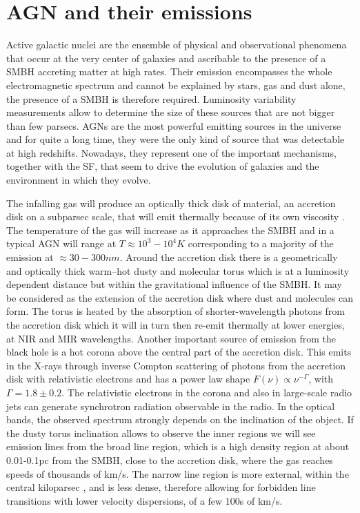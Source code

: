 \section{AGN and their emissions}
Active galactic nuclei are the ensemble of physical and observational phenomena that occur at the very center of galaxies and ascribable to the presence of a SMBH accreting matter at high rates. Their emission encompasses the whole electromagnetic spectrum and cannot be explained by stars, gas and dust alone, the presence of a SMBH is therefore required. Luminosity variability measurements allow to determine the size of these sources that are not bigger than few parsecs. AGNs are the most powerful emitting sources in the universe and for quite a long time, they were the only kind of source that was detectable at high redshifts. Nowadays, they represent one of the important mechanisms, together with the SF, that seem to drive the evolution of galaxies and the environment in which they evolve.

The infalling gas will produce an optically thick disk of material, an accretion disk on a subparsec scale, that will emit thermally because of its own viscosity \citep[e.g.][]{1973A&A....24..337S, 1984ARA&A..22..471R}. The temperature of the gas will increase as it approaches the SMBH and in a typical AGN will range at $T \approx 10^3-10^4 K$ corresponding to a majority of the emission at $\approx 30-300 nm$.
Around the accretion disk there is a geometrically and optically thick warm–hot dusty and molecular torus which is at a luminosity dependent distance but within the gravitational influence of the SMBH. It may be considered as the extension of the accretion disk where dust and molecules can form. The torus is heated by the absorption of shorter-wavelength photons from the accretion disk which it will in turn then re-emit thermally at lower energies, at NIR and MIR wavelengths.
Another important source of emission from the black hole is a hot corona above the central part of the accretion disk. This emits in the X-rays through inverse Compton scattering of photons from the accretion disk with relativistic electrons and has a power law shape $F(\nu)\propto \nu^{-\Gamma}$, with $\Gamma=1.8\pm0.2$. 
The relativistic electrons in the corona and also in large-scale radio jets can generate synchrotron radiation observable in the radio.
In the optical bands, the observed spectrum strongly depends on the inclination of the object. If the dusty torus inclination allows to observe the inner regions we will see emission lines from the broad line region, which is a high density region at about 0.01-0.1pc from the SMBH, close to the accretion disk, where the gas reaches speeds of thousands of km/s. The narrow line region is more external, within the central kiloparsec \citep[e.g.][]{2015MNRAS.454.4452H,2016MNRAS.460..130V}, and is less dense, therefore allowing for forbidden line transitions with lower velocity dispersions, of a few 100s of km/s.

